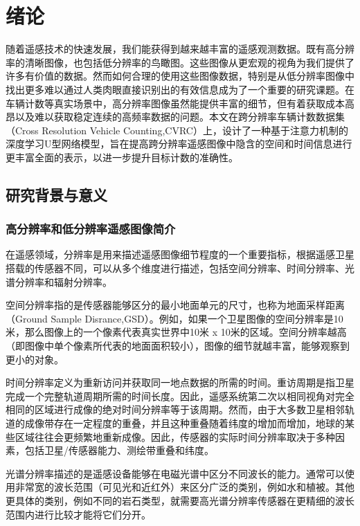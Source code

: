 
\chapter{绪论}
随着遥感技术的快速发展，我们能获得到越来越丰富的遥感观测数据。既有高分辨率的清晰图像，也包括低分辨率的鸟瞰图。这些图像从更宏观的视角为我们提供了许多有价值的数据。然而如何合理的使用这些图像数据，特别是从低分辨率图像中找出更多难以通过人类肉眼直接识别出的有效信息成为了一个重要的研究课题。在车辆计数等真实场景中，高分辨率图像虽然能提供丰富的细节，但有着获取成本高昂以及难以获取稳定连续的高频率数据的问题。本文在跨分辨率车辆计数数据集（Cross Resolution Vehicle Counting,CVRC）\cite{2022VehicleCountingVeryLowResolutionAerialImagesCrossResolutionSpatialConsistencyIntraresolutionTimeContinuity}上，设计了一种基于注意力机制\cite{vaswani2017attention}的深度学习U型网络模型，旨在提高跨分辨率遥感图像中隐含的空间和时间信息进行更丰富全面的表示，以进一步提升目标计数的准确性。
\section{研究背景与意义}
\subsection{高分辨率和低分辨率遥感图像简介}
在遥感领域，分辨率是用来描述遥感图像细节程度的一个重要指标，根据遥感卫星搭载的传感器不同，可以从多个维度进行描述，包括空间分辨率、时间分辨率、光谱分辨率和辐射分辨率。

空间分辨率指的是传感器能够区分的最小地面单元的尺寸，也称为地面采样距离（Ground Sample Disrance,GSD）。例如，如果一个卫星图像的空间分辨率是10米，那么图像上的一个像素代表真实世界中10米 x 10米的区域。空间分辨率越高（即图像中单个像素所代表的地面面积较小），图像的细节就越丰富，能够观察到更小的对象。

时间分辨率定义为重新访问并获取同一地点数据的所需的时间。重访周期是指卫星完成一个完整轨道周期所需的时间长度。因此，遥感系统第二次以相同视角对完全相同的区域进行成像的绝对时间分辨率等于该周期。然而，由于大多数卫星相邻轨道的成像带存在一定程度的重叠，并且这种重叠随着纬度的增加而增加，地球的某些区域往往会更频繁地重新成像。因此，传感器的实际时间分辨率取决于多种因素，包括卫星/传感器能力、测绘带重叠和纬度。

光谱分辨率描述的是遥感设备能够在电磁光谱中区分不同波长的能力。通常可以使用非常宽的波长范围（可见光和近红外）来区分广泛的类别，例如水和植被。其他更具体的类别，例如不同的岩石类型，就需要高光谱分辨率传感器在更精细的波长范围内进行比较才能将它们分开。

